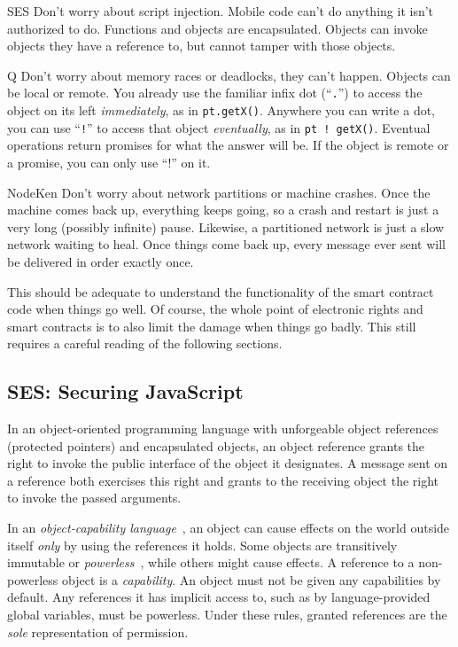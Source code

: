 \documentclass{llncs}
\begin{document}
\begin{description*}
\item[SES] Don't worry about script injection. Mobile code can't do anything it isn't authorized to do. Functions and objects are encapsulated. Objects can invoke objects they have a reference to, but cannot tamper with those objects.

\item[Q] Don't worry about memory races or deadlocks, they can't happen. Objects can be local or remote. You already use the familiar infix dot (``{\tt .}'') to access the object on its left \emph{immediately}, as in {\tt pt.getX()}. Anywhere you can write a dot, you can use ``{\tt !}'' to access that object \emph{eventually}, as in {\tt pt ! getX()}. Eventual operations return promises for what the answer will be. If the object is remote or a promise, you can only use ``{!}'' on it.

\item[NodeKen] Don't worry about network partitions or machine crashes. Once the machine comes back up, everything keeps going, so a crash and restart is just a very long (possibly infinite) pause. Likewise, a partitioned network is just a slow network waiting to heal. Once things come back up, every message ever sent will be delivered in order exactly once.
\end{description*}

This should be adequate to understand the functionality of the smart contract code when things go well. Of course, the whole point of electronic rights and smart contracts is to also limit the damage when things go badly. This still requires a careful reading of the following sections.
 

\subsection{SES: Securing JavaScript}
\label{ses}

In an object-oriented programming language with unforgeable object references (protected pointers) and encapsulated objects, an object reference grants the right to invoke the public interface of the object it designates. A message sent on a reference both exercises this right and grants to the receiving object the right to invoke the passed arguments. 

In an \emph{object-capability language}~\cite{RobustComposition}, an object can cause effects on the world outside itself \emph{only} by using the references it holds. Some objects are transitively immutable or \emph{powerless}~\cite{Mettler:EECS-2012-244}, while others might cause effects. A reference to a non-powerless object is a \emph{capability}. An object must not be given any capabilities by default. Any references it has implicit access to, such as by language-provided global variables, must be powerless. Under these rules, granted references are the \emph{sole} representation of permission.
\end{document}
